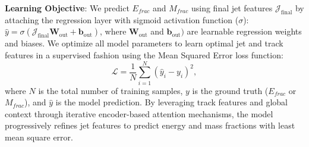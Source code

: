 \textbf{Learning Objective}: We predict $E_{frac}$ and $M_{frac}$ using final jet features \(\mathcal{J}_{\text{final}}\) by attaching the regression layer with sigmoid activation function ($\sigma$): $\hat{y} = \sigma(\mathcal{J}_{\text{final}} \mathbf{W}_{\text{out}} + \mathbf{b}_{\text{out}})$, where $\mathbf{W}_{\text{out}}$ and $\mathbf{b}_{\text{out}})$ are learnable regression weights and biases. We optimize all model parameters to learn optimal jet and track features in a supervised fashion using the Mean Squared Error loss function:
\[
\mathcal{L} = \frac{1}{N} \sum_{i=1}^N \left( \hat{y}_i - y_i \right)^2,
\]
where \(N\) is the total number of training samples, $y$ is the ground truth ($E_{frac}$ or $M_{frac}$), and $\hat{y}$ is the model prediction. By leveraging track features and global context through iterative encoder-based attention mechanisms, the model progressively refines jet features to predict energy and mass fractions with least mean square error.








